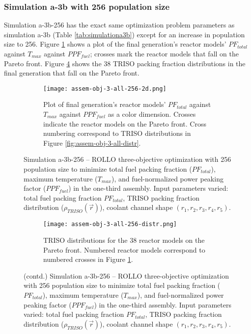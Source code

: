\subsubsection{Simulation a-3b with 256 population size}
Simulation a-3b-256 has the exact same optimization problem parameters as simulation 
a-3b (Table \ref{tab:simulationa3b}) except for an increase in population size to 256. 
Figure \ref{fig:assem-obj-3-all-256-2d} shows a plot of the final generation's reactor 
models' $PF_{total}$ against $T_{max}$ against $PPF_{fuel}$; crosses mark the reactor 
models that fall on the Pareto front.
Figure \ref{fig:assem-obj-3-all-256-distr} shows the 38 TRISO packing fraction 
distributions in the final generation that fall on the Pareto front. 
\begin{figure}[htbp!]
    \begin{subfigure}{\textwidth}
        \centering
        \texttt{[image: assem-obj-3-all-256-2d.png]}
        \caption{Plot of final generation's reactor models' $PF_{total}$ against 
        $T_{max}$ against $PPF_{fuel}$ as a color dimension. 
        Crosses indicate the reactor models on the 
        Pareto front. Cross numbering correspond to TRISO distributions in Figure 
        \ref{fig:assem-obj-3-all-distr}.}
        \label{fig:assem-obj-3-all-256-2d} 
    \end{subfigure}
    \caption{Simulation a-3b-256 -- ROLLO three-objective optimization with 
    256 population size to minimize total fuel packing fraction ($PF_{total}$), 
    maximum temperature ($T_{max}$), and fuel-normalized power peaking factor 
    ($PPF_{fuel}$) in the one-third assembly. 
    Input parameters varied: total fuel packing fraction $PF_{total}$, 
    TRISO packing fraction distribution ($\rho_{TRISO}(\vec{r})$), 
    coolant channel shape $(r_1, r_2, r_3, r_4, r_5)$.}
    \label{fig:assem-obj-3-256-all}
\end{figure}
\begin{figure}[htbp!]
    \ContinuedFloat
    \begin{subfigure}{\textwidth}
        \centering
        \texttt{[image: assem-obj-3-all-256-distr.png]}
        \caption{TRISO distributions for the 38 reactor models on the Pareto front.
        Numbered reactor models correspond to numbered crosses in Figure 
        \ref{fig:assem-obj-3-all-256-2d}. }
        \label{fig:assem-obj-3-all-256-distr} 
    \end{subfigure}
    \caption{(contd.) Simulation a-3b-256 -- ROLLO three-objective optimization with 
    256 population size to minimize total fuel packing fraction ($PF_{total}$), 
    maximum temperature ($T_{max}$), and fuel-normalized power peaking factor 
    ($PPF_{fuel}$) in the one-third assembly. 
    Input parameters varied: total fuel packing fraction $PF_{total}$, 
    TRISO packing fraction distribution ($\rho_{TRISO}(\vec{r})$), 
    coolant channel shape $(r_1, r_2, r_3, r_4, r_5)$.}
\end{figure}

